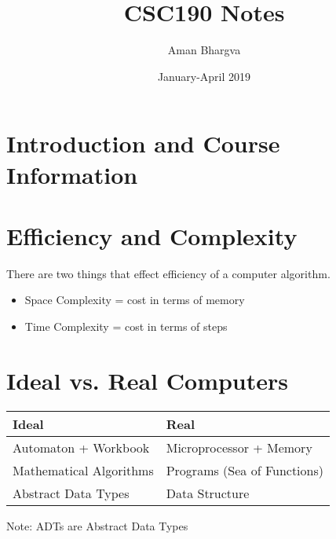\documentclass[a4paper,12pt]{article}
\begin{document}
\title{CSC190 Notes}
\author{Aman Bhargva}
\date{January-April 2019}
\maketitle

\tableofcontents

\section{Introduction and Course Information}

\section{Efficiency and Complexity}
There are two things that effect efficiency of a computer algorithm.
\begin{itemize}
\item Space Complexity = cost in terms of memory
\item Time Complexity = cost in terms of steps
\end{itemize}

\section{Ideal vs. Real Computers}
\begin{tabular}{l|l}
Ideal & Real \\
\hline
Automaton + Workbook & Microprocessor + Memory \\
Mathematical Algorithms & Programs (Sea of Functions) \\
Abstract Data Types & Data Structure 
\end{tabular}

Note: ADTs are Abstract Data Types
\end{document}
